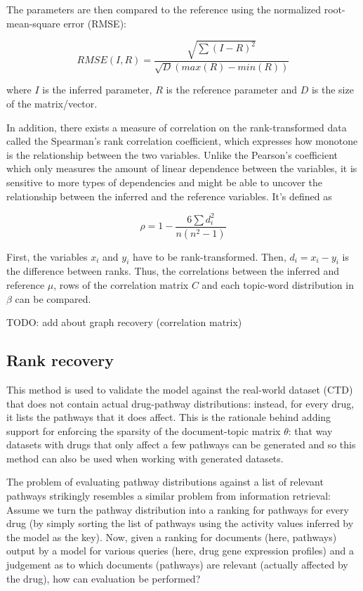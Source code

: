 \documentclass[12pt,a4paper,twoside,openright]{report}
\begin{document}
The parameters are then compared to the reference using the normalized root-mean-square error (RMSE):

\begin{equation}
\mathit{RMSE}(I, R) = \frac{\sqrt{\sum{(I-R)^2}}}{\sqrt{D}(max(R) - min(R))}
\end{equation}

where $I$ is the inferred parameter, $R$ is the reference parameter and $D$ is the size of the matrix/vector.

In addition, there exists a measure of correlation on the rank-transformed data called the Spearman's rank correlation coefficient, which expresses how monotone is the relationship between the two variables. Unlike the Pearson's coefficient which only measures the amount of linear dependence between the variables, it is sensitive to more types of dependencies and might be able to uncover the relationship between the inferred and the reference variables. It's defined as 

\begin{equation}
\rho  = 1 - \frac{6\sum d^2_i}{n ( n^2-1)}
\end{equation}

First, the variables $x_i$ and $y_i$ have to be rank-transformed. Then, $d_i = x_i - y_i$ is the difference between ranks. Thus, the correlations between the inferred and reference $\mu$, rows of the correlation matrix $C$ and each topic-word distribution in $\beta$ can be compared.

TODO: add about graph recovery (correlation matrix)

\subsection{Rank recovery}

This method is used to validate the model against the real-world dataset (CTD) that does not contain actual drug-pathway distributions: instead, for every drug, it lists the pathways that it does affect. This is the rationale behind adding support for enforcing the sparsity of the document-topic matrix $\theta$: that way datasets with drugs that only affect a few pathways can be generated and so this method can also be used when working with generated datasets.

The problem of evaluating pathway distributions against a list of relevant pathways strikingly resembles a similar problem from information retrieval: Assume we turn the pathway distribution into a ranking for pathways for every drug (by simply sorting the list of pathways using the activity values inferred by the model as the key). Now, given a ranking for documents (here, pathways) output by a model for various queries (here, drug gene expression profiles) and a judgement as to which documents (pathways) are relevant (actually affected by the drug), how can evaluation be performed?
\end{document}
